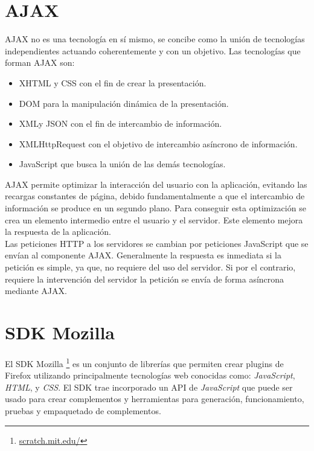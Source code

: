 \documentclass[a4paper, 12pt]{book}
\begin{document}
\section{AJAX}
\label{sec:seccion7}

AJAX no es una tecnología en sí mismo, se concibe como la unión de tecnologías independientes
actuando coherentemente y con un objetivo. Las tecnologías que forman AJAX son:

\begin{itemize}
  \item XHTML y CSS con el fin de crear la presentación.
	\item DOM para la manipulación dinámica de la presentación.
	\item XMLy JSON con el fin de intercambio de información.
	\item XMLHttpRequest con el objetivo de intercambio asíncrono de información.
	\item JavaScript que busca la unión de las demás tecnologías.
\end{itemize}

AJAX permite optimizar la interacción del usuario con la aplicación, evitando las recargas
constantes de página, debido fundamentalmente a que el intercambio de información se 
produce en un segundo plano. Para conseguir esta optimización se crea un elemento intermedio
entre el usuario y el servidor. Este elemento mejora la respuesta de la aplicación. \\

Las peticiones HTTP a los servidores se cambian por peticiones JavaScript que se envían al 
componente AJAX. Generalmente la respuesta es inmediata si la petición es simple, ya que, 
no requiere del uso del servidor. Si por el contrario, requiere la intervención del servidor
la petición se envía de forma asíncrona mediante AJAX.


\section{SDK Mozilla}
\label{sec:seccion8}

El SDK Mozilla \footnote{\url{scratch.mit.edu/}} es un conjunto de librerías que permiten crear 
plugins de Firefox utilizando principalmente tecnologías web conocidas como: \emph{JavaScript}, 
\emph{HTML}, y \emph{CSS}. El SDK trae incorporado un API de \emph{JavaScript} que puede ser 
usado para crear complementos y herramientas para generación, funcionamiento, pruebas y
empaquetado de complementos.  \\
\end{document}
